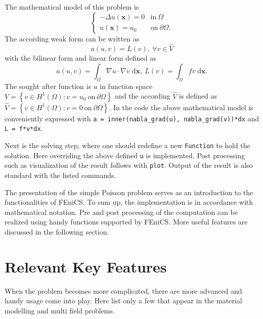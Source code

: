 \documentclass[10pt,a4paper]{scrreprt}
\newcommand{\myd}{\;\mathrm{d}}
\begin{document}
The mathematical model of this problem is 
\begin{equation}
\label{eq: poisson}
\left\{
\begin{array}{ll}
-\Delta u(\mathbf{x})=0 & \text{in} \ \Omega \\
u(\mathbf{x})=u_{0} & \text{on} \ \partial \Omega .
\end{array}
\right.
\end{equation}
The according weak form can be written as
\begin{equation}
\label{eq: weak}
a(u,v) = L(v), \ \forall v \in \hat{V}
\end{equation}
with the bilinear form and linear form defined as
\[
a(u,v) = \int_{\Omega} \nabla{u} \cdot \nabla{v} \myd{\mathbf{x}}, \ L(v) = \int_{\Omega} fv \myd{\mathbf{x}}.
\]
The sought after function is $u$ in function space $V = \left\lbrace v \in H^{1}\left( \Omega \right) : v=u_{0} \  \text{on} \ \partial \Omega \right\rbrace$ and the according $\hat{V}$ is defined as $\hat{V} = \left\lbrace v \in H^{1}\left( \Omega \right) : v=0 \  \text{on} \ \partial \Omega \right\rbrace$. In the code the above mathematical model is conveniently expressed with \texttt{a\ =\ inner(nabla\_grad(u),\ nabla\_grad(v))*dx} and \texttt{L\ =\ f*v*dx}.

Next is the solving step, where one should redefine a new \texttt{Function} to hold the solution. Here overriding the above defined \texttt{u} is implemented. Post processing such as visualization of the result follows with \texttt{plot}. Output of the result is also standard with the listed commands.

The presentation of the simple Poisson problem serves as an introduction to the functionalities of FEniCS. To sum up, the implementation is in accordance with mathematical notation. Pre and post processing of the computation can be realized using handy functions supported by FEniCS. More useful features are discussed in the following section.

\section{Relevant Key Features}
When the problem becomes more complicated, there are more advanced and handy usage come into play. Here list only a few that appear in the material modelling and multi field problems.
\end{document}
